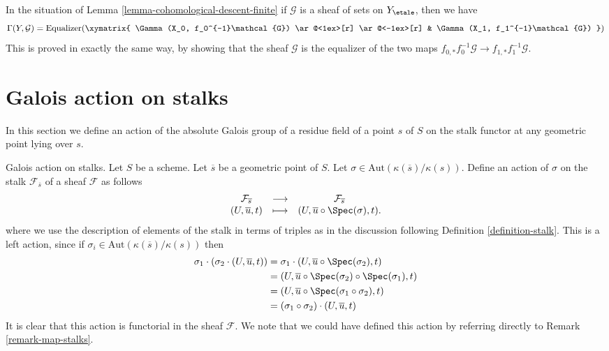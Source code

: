 \begin{remark}
\label{remark-cohomological-descent-finite}
In the situation of Lemma \ref{lemma-cohomological-descent-finite}
if $\mathcal{G}$ is a sheaf of sets on $Y_\etale$, then we have
$$
\Gamma(Y, \mathcal{G}) =
\text{Equalizer}(
\xymatrix{
\Gamma(X_0, f_0^{-1}\mathcal{G})
\ar@<1ex>[r] \ar@<-1ex>[r] &
\Gamma(X_1, f_1^{-1}\mathcal{G})
}
)
$$
This is proved in exactly the same way, by showing that
the sheaf $\mathcal{G}$ is the equalizer of the two maps
$f_{0, *}f_0^{-1}\mathcal{G} \to f_{1, *}f_1^{-1}\mathcal{G}$.
\end{remark}









\section{Galois action on stalks}
\label{section-galois-action-stalks}

\noindent
In this section we define an action of the absolute Galois group of a residue
field of a point $s$ of $S$ on the stalk functor at any geometric point lying
over $s$.

\medskip\noindent
Galois action on stalks.
Let $S$ be a scheme.
Let $\overline{s}$ be a geometric point of $S$.
Let $\sigma \in \text{Aut}(\kappa(\overline{s})/\kappa(s))$.
Define an action of $\sigma$ on the stalk $\mathcal{F}_{\overline{s}}$
of a sheaf $\mathcal{F}$ as follows
\begin{equation}
\label{equation-galois-action}
\begin{matrix}
\mathcal{F}_{\overline{s}} &
\longrightarrow &
\mathcal{F}_{\overline{s}} \\
(U, \overline{u}, t) &
\longmapsto &
(U, \overline{u} \circ \Spec(\sigma), t).
\end{matrix}
\end{equation}
where we use the description of elements of the stalk in terms of triples
as in the discussion following
Definition \ref{definition-stalk}.
This is a left action, since if
$\sigma_i \in \text{Aut}(\kappa(\overline{s})/\kappa(s))$
then
\begin{align*}
\sigma_1 \cdot (\sigma_2 \cdot (U, \overline{u}, t))
& =
\sigma_1 \cdot (U, \overline{u} \circ \Spec(\sigma_2), t) \\
& =
(U, \overline{u} \circ \Spec(\sigma_2) \circ \Spec(\sigma_1), t) \\
& =
(U, \overline{u} \circ \Spec(\sigma_1 \circ \sigma_2), t) \\
& =
(\sigma_1 \circ \sigma_2) \cdot (U, \overline{u}, t)
\end{align*}
It is clear that this action is functorial in the sheaf $\mathcal{F}$.
We note that we could have defined this action by referring directly to
Remark \ref{remark-map-stalks}.

